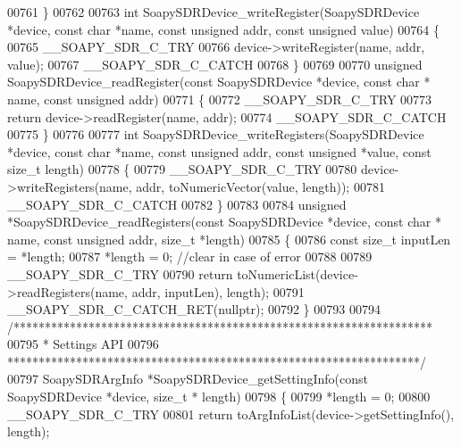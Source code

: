 \begin{DoxyCode}
00761 \}
00762 
00763 \textcolor{keywordtype}{int} SoapySDRDevice_writeRegister(SoapySDRDevice *device, \textcolor{keyword}{const} \textcolor{keywordtype}{char} *name, \textcolor{keyword}{const} \textcolor{keywordtype}{unsigned} addr, \textcolor{keyword}{const} \textcolor{keywordtype}{
      unsigned} value)
00764 \{
00765     __SOAPY_SDR_C_TRY
00766     device->writeRegister(name, addr, value);
00767     __SOAPY_SDR_C_CATCH
00768 \}
00769 
00770 \textcolor{keywordtype}{unsigned} SoapySDRDevice_readRegister(\textcolor{keyword}{const} SoapySDRDevice *device, \textcolor{keyword}{const} \textcolor{keywordtype}{char} *
      name, \textcolor{keyword}{const} \textcolor{keywordtype}{unsigned} addr)
00771 \{
00772     __SOAPY_SDR_C_TRY
00773     \textcolor{keywordflow}{return} device->readRegister(name, addr);
00774     __SOAPY_SDR_C_CATCH
00775 \}
00776 
00777 \textcolor{keywordtype}{int} SoapySDRDevice_writeRegisters(SoapySDRDevice *device, \textcolor{keyword}{const} \textcolor{keywordtype}{char} *name, \textcolor{keyword}{const} \textcolor{keywordtype}{unsigned} addr, \textcolor{keyword}{const} \textcolor{keywordtype}{
      unsigned} *value, \textcolor{keyword}{const} \textcolor{keywordtype}{size\_t} length)
00778 \{
00779     __SOAPY_SDR_C_TRY
00780     device->writeRegisters(name, addr, toNumericVector(value, length));
00781     __SOAPY_SDR_C_CATCH
00782 \}
00783 
00784 \textcolor{keywordtype}{unsigned} *SoapySDRDevice_readRegisters(\textcolor{keyword}{const} SoapySDRDevice *device, \textcolor{keyword}{const} \textcolor{keywordtype}{char} *
      name, \textcolor{keyword}{const} \textcolor{keywordtype}{unsigned} addr, \textcolor{keywordtype}{size\_t} *length)
00785 \{
00786     \textcolor{keyword}{const} \textcolor{keywordtype}{size\_t} inputLen = *length;
00787     *length = 0; \textcolor{comment}{//clear in case of error}
00788 
00789     __SOAPY_SDR_C_TRY
00790     \textcolor{keywordflow}{return} toNumericList(device->readRegisters(name, addr, inputLen), length);
00791     __SOAPY_SDR_C_CATCH_RET(\textcolor{keyword}{nullptr});
00792 \}
00793 
00794 \textcolor{comment}{/*******************************************************************}
00795 \textcolor{comment}{ * Settings API}
00796 \textcolor{comment}{ ******************************************************************/}
00797 SoapySDRArgInfo *SoapySDRDevice_getSettingInfo(\textcolor{keyword}{const} SoapySDRDevice *device, \textcolor{keywordtype}{size\_t} *
      length)
00798 \{
00799     *length = 0;
00800     __SOAPY_SDR_C_TRY
00801     \textcolor{keywordflow}{return} toArgInfoList(device->getSettingInfo(), length);

\end{DoxyCode}
